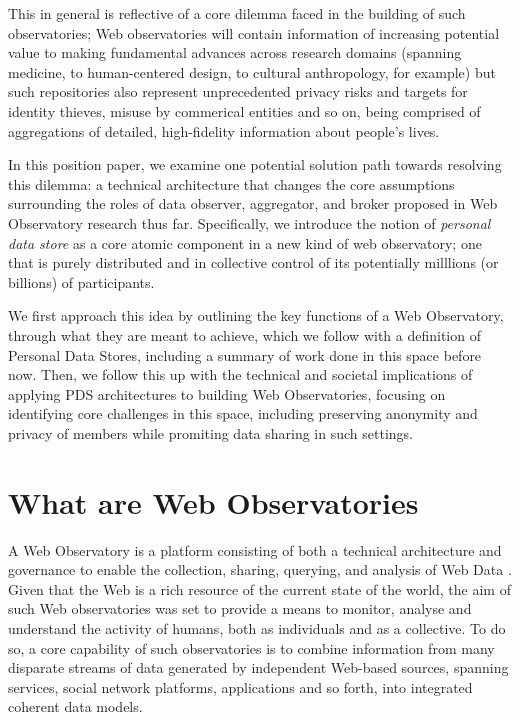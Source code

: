 \documentclass{acm_proc_article-sp}
\begin{document}
This in general is reflective of a core dilemma faced in the building of such
observatories; Web observatories will contain information
of increasing potential value to making fundamental advances across research domains (spanning medicine, to human-centered design, to cultural anthropology, for example) but such repositories also represent unprecedented privacy risks and targets for identity thieves, misuse by commerical entities and so on, being comprised of aggregations of detailed, high-fidelity information about people's lives. 

In this position paper, we examine one potential solution path towards resolving this dilemma: a technical architecture that changes the core assumptions surrounding the roles of data observer, aggregator, and broker proposed in Web Observatory research thus far.  Specifically, we introduce the notion of \emph{personal data store} as a core atomic component in a new kind of web observatory; one that is purely distributed and in collective control of its potentially milllions (or billions) of participants. 

We first approach this idea by outlining the key functions of a Web Observatory, through what they are meant to achieve, which we follow with a definition of Personal Data Stores, including a summary of work done in this space before now.  Then, we follow this up with the technical and societal implications of applying PDS architectures to building Web Observatories, focusing on identifying core challenges in this space, including preserving anonymity and privacy of members while promiting data sharing in such settings.



\section{What are Web Observatories}
A Web Observatory is a platform consisting of both a technical architecture and governance to enable the collection, sharing, querying, and analysis of Web Data \cite{Hall2013, Tiropanis2014}. Given that the Web is a rich resource of the current state of the world, the aim of such Web observatories was set to provide a means to monitor, analyse and understand the activity of humans, both as individuals and as a collective. To do so, a core capability of such observatories is to combine information from many disparate streams of data generated by independent Web-based sources, spanning services, social network platforms, applications and so forth, into integrated coherent data models.
 
\end{document}
